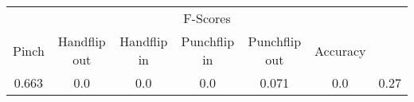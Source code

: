 \documentclass{standalone}
\begin{document}
 
 \begin{tabular}{|c|c|c|c|c|c ||c|}
\cline{1-7}\multicolumn{7}{|c|}{F-Scores} \\ 
\cline{1-7}Pinch & Handflip out & Handflip in & Punchflip in & Punchflip out & Accuracy\\ 
\cline{1-7}0.663 & 0.0 & 0.0 & 0.0 & 0.071 & 0.0 & 0.27\\ 
 \cline{1-7}\hline \end{tabular}
 
\end{document}
